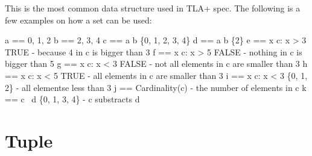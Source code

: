 \documentclass{report}
\begin{document}
This is the most common data structure used in TLA+ spec. The following is a few examples on
how a set can be used:\newline
\begin{tla}
a == {0, 1, 2}
b == {2, 3, 4}
c == a \union b         \* \{0, 1, 2, 3, 4\}
d == a \intersect b     \* \{2\}
e == \E x \in c: x > 3  \* TRUE - because 4 in c is bigger than 3
f == \E x \in c: x > 5  \* FALSE - nothing in c is bigger than 5
g == \A x \in c: x < 3  \* FALSE - not all elements in c are smaller than 3
h == \A x \in c: x < 5  \* TRUE - all elements in c are smaller than 3
i == {x \in c: x < 3}   \* \{0, 1, 2\} - all elementse less than 3
j == Cardinality(c)      - the number of elements in c
k == c \ d              \* \{0, 1, 3, 4\} - c substracts d
\end{tla}
\begin{tlatex}
%
%
%
%
\@xx{}%
%
%
\@xx{}%
%
%
\@xx{}%
%
%
\@xx{}%
%
%
\@xx{}%
%
%
\@xx{}%
%
%
\@xx{}%
%
%
\@xx{}%
%
%
\@xx{}%
\end{tlatex}

\section{Tuple}
\end{document}
